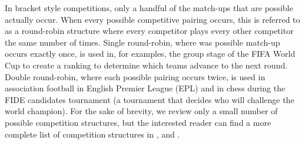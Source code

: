 \documentclass[
  12pt]{article}
\begin{document}
In bracket style competitions, only a handful of the match-ups that are
possible actually occur. When every possible competitive pairing occurs,
this is referred to as a round-robin structure where every competitor
plays every other competitor the same number of times. Single
round-robin, where was possible match-up occurs exactly once, is used
in, for examples, the group stage of the FIFA World Cup to create a
ranking to determine which teams advance to the next round. Double
round-robin, where each possible pairing occurs twice, is used in
association football in English Premier League (EPL) and in chess during
the FIDE candidates tournament (a tournament that decides who will
challenge the world champion). For the sake of brevity, we review only a
small number of possible competition structures, but the interested
reader can find a more complete list of competition structures in
\citet{Goosens2024}, \citet{Appleton1995-zn} and \citet{Csato2021}.

\citet{Daniels1969}
\end{document}
